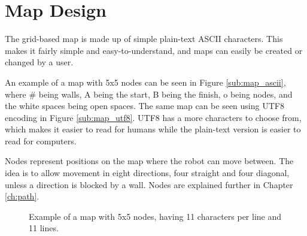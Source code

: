\newpage

\section{Map Design}
\label{sec:map_design} %
The grid-based map is made up of simple plain-text ASCII characters.
This makes it fairly simple and easy-to-understand, and maps can easily be created or changed by a user. 

An example of a map with 5x5 nodes can be seen in Figure \ref{sub:map_ascii}, where \# being walls, A being the start, B being the finish, o being nodes, and the white spaces being open spaces. The same map can be seen using UTF8 encoding in Figure \ref{sub:map_utf8}. UTF8 has a more characters to choose from, which makes it easier to read for humans while the plain-text version is easier to read for computers.

Nodes represent positions on the map where the robot can move between. The idea is to allow movement in eight directions, four straight and four diagonal, unless a direction is blocked by a wall. Nodes are explained further in Chapter \ref{ch:path}.

\begin{figure}[htp]
    \centering
    \hspace{0.2\textwidth}
    \caption{Example of a map with 5x5 nodes, having 11 characters per line and 11 lines.}
    \label{fig:5x5map}
\end{figure}

